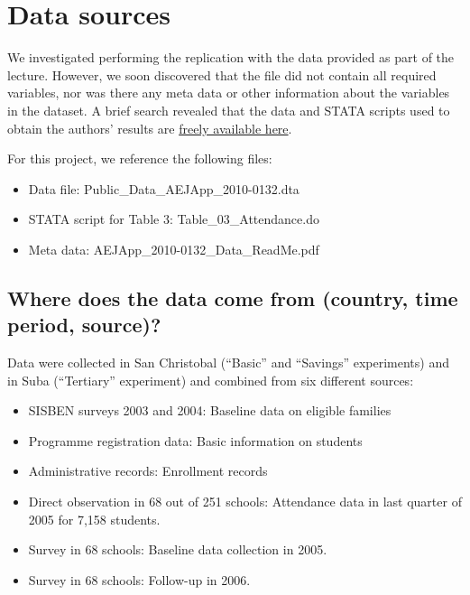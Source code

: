 \documentclass[
]{article}
\providecommand{\tightlist}{%
  \setlength{\itemsep}{0pt}\setlength{\parskip}{0pt}}
\begin{document}
\hypertarget{data-sources}{%
\section{Data sources}\label{data-sources}}

We investigated performing the replication with the data provided as
part of the lecture. However, we soon discovered that the file did not
contain all required variables, nor was there any meta data or other
information about the variables in the dataset. A brief search revealed
that the data and STATA scripts used to obtain the authors' results are
\href{https://www.openicpsr.org/openicpsr/project/113783/version/V1/view?path=/openicpsr/113783/fcr:versions/V1/AEJApp_2010-0132_Data\&type=folder}{freely
available here}.

For this project, we reference the following files:

\begin{itemize}
\tightlist
\item
  Data file: Public\_Data\_AEJApp\_2010-0132.dta
\item
  STATA script for Table 3: Table\_03\_Attendance.do
\item
  Meta data: AEJApp\_2010-0132\_Data\_ReadMe.pdf
\end{itemize}

\hypertarget{where-does-the-data-come-from-country-time-period-source}{%
\subsection{Where does the data come from (country, time period,
source)?}\label{where-does-the-data-come-from-country-time-period-source}}

Data were collected in San Christobal (``Basic'' and ``Savings''
experiments) and in Suba (``Tertiary'' experiment) and combined from six
different sources:

\begin{itemize}
\tightlist
\item
  SISBEN surveys 2003 and 2004: Baseline data on eligible families
\item
  Programme registration data: Basic information on students
\item
  Administrative records: Enrollment records
\item
  Direct observation in 68 out of 251 schools: Attendance data in last
  quarter of 2005 for 7,158 students.
\item
  Survey in 68 schools: Baseline data collection in 2005.
\item
  Survey in 68 schools: Follow-up in 2006.
\end{itemize}
\end{document}
